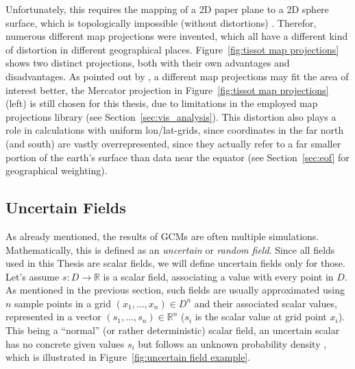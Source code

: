 Unfortunately, this requires the mapping of a 2D paper plane to a 2D sphere surface, which is topologically impossible (without distortions) \cite{vietinghoffdiss}.
Therefor, numerous different map projections were invented, which all have a different kind of distortion in different geographical places. 
Figure~\ref{fig:tissot map projections} shows two distinct projections, both with their own advantages and disadvantages. 
As pointed out by , a different map projections may fit the area of interest better, the Mercator projection in Figure~\ref{fig:tissot map projections} (left) is still chosen for this thesis, due to limitations in the employed map projections library (see Section~\ref{sec:vis_analysis}). 
This distortion also plays a role in calculations with uniform lon/lat-grids, since coordinates in the far north (and south) are vastly overrepresented, since they actually refer to a far smaller portion of the earth's surface than data near the equator (see Section~\ref{sec:eof} for geographical weighting). 


\subsection{Uncertain Fields}


As already mentioned, the results of GCMs are often multiple simulations. 
Mathematically, this is defined as an \textit{uncertain} or \textit{random field}. 
Since all fields used in this Thesis are scalar fields, we will define uncertain fields only for those. 
Let's assume $s : D \rightarrow \mathbb{R}$ is a scalar field, associating a value  with every point in $D$. 
As mentioned in the previous section, such fields are usually approximated using $n$ sample points in a grid $(x_1,\dots, x_n) \in D^n$ and their associated scalar values, represented in a vector $(s_1,\dots,s_n) \in \mathbb{R}^n$ ($s_i$ is the scalar value at grid point $x_i$).
This being a \enquote{normal} (or rather deterministic) scalar field, an uncertain scalar has no concrete given values $s_i$ but follows an unknown probability density \cite{vietinghoffdiss}, which is illustrated in Figure~\ref{fig:uncertain field example}. 


